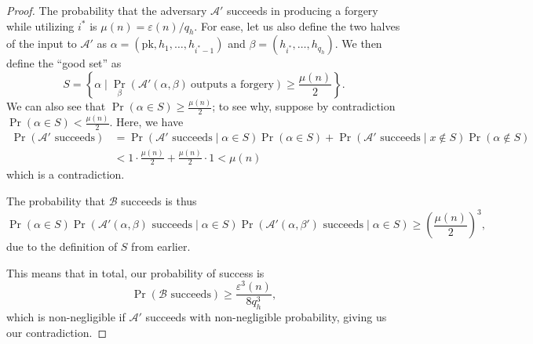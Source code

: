 \begin{proof}
    The probability that the adversary $\mathcal{A}'$ succeeds in producing a forgery while utilizing $i^*$ is $\mu(n) = \varepsilon(n) / q_h$. For ease, let us also define the two halves of the input to $\mathcal{A}'$ as $\alpha = (\mathrm{pk}, h_1, \ldots, h_{i^* - 1})$ and $\beta = (h_{i^*}, \ldots, h_{q_h})$. We then define the ``good set'' as
    \[
        S = \left\{\alpha \mid \Pr_{\beta}(\mathcal{A}'(\alpha, \beta)\ \text{outputs a forgery}) \ge \frac{\mu(n)}{2}\right\}
    .\]
    We can also see that $\Pr(\alpha \in S) \ge \frac{\mu(n)}{2}$; to see why, suppose by contradiction $\Pr(\alpha \in S) < \frac{\mu(n)}{2}$. Here, we have
    \begin{align*}
        \Pr(\text{$\mathcal{A}'$ succeeds}) &= \Pr(\text{$\mathcal{A}'$ succeeds} \mid \alpha \in S) \Pr(\alpha \in S) + \Pr(\text{$\mathcal{A}'$ succeeds} \mid x \notin S) \Pr(\alpha \notin S) \\
                                            &< 1 \cdot \frac{\mu(n)}{2} + \frac{\mu(n)}{2} \cdot 1 < \mu(n)
    \end{align*}
    which is a contradiction.

    The probability that $\mathcal{B}$ succeeds is thus
    \[
        \Pr(\alpha \in S) \Pr(\text{$\mathcal{A}'(\alpha, \beta)$ succeeds} \mid \alpha \in S) \Pr(\text{$\mathcal{A}'(\alpha, \beta')$ succeeds} \mid \alpha \in S)
        \ge \left(\frac{\mu(n)}{2}\right)^3
    ,\]
    due to the definition of $S$ from earlier.

    This means that in total, our probability of success is
    \[
        \Pr(\text{$\mathcal{B}$ succeeds}) \ge \frac{\varepsilon^3(n)}{8q_h^3}
    ,\]
    which is non-negligible if $\mathcal{A}'$ succeeds with non-negligible probability, giving us our contradiction.
\end{proof}
